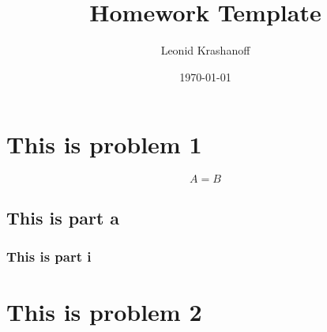 \documentclass{article}
\title{Homework Template}
\author{Leonid Krashanoff}
\date{\today}
\begin{document}
\maketitle

\tableofcontents

\clearpage

\section{This is problem 1}

$$A = B$$

\subsection{This is part a}

\subsubsection{This is part i}

\section{This is problem 2}
\end{document}
